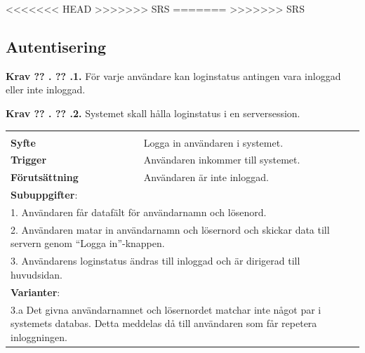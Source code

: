 \documentclass[a4paper]{article}
\newcommand\getcurrentref[1]{%
 \ifnumequal{\value{#1}}{0}
  {??}
  {\the\value{#1}}%
}
\newcommand\requirement[2]{
	\numberedrow{Krav}{#1}{#2}
}
\newcommand\scenario[2] {
	\numberedrow{Scenario}{#1}{#2}
}
\newcommand\numberedrow[3]{
	\noindent
	\textbf{#1 \getcurrentref{section}.\getcurrentref{subsection}.#2.} #3
	
}
\begin{document}
<<<<<<< HEAD
>>>>>>> SRS
=======
>>>>>>> SRS
\subsection{Autentisering}
\label{krav-funk-aut}
\requirement{1}{För varje användare kan loginstatus antingen vara inloggad eller inte inloggad.}
\requirement{2}{Systemet skall hålla loginstatus i en serversession.}


\begin{table}[H]
\begin{tabular}{ | p{2cm} p{11cm} | }
   
        \hline
	\multicolumn{2}{|p{13cm}|}{ \indent\scenario{1}} \\
    \textbf{Syfte} & Logga in användaren i systemet.\\
    \textbf{Trigger} & Användaren inkommer till systemet. \\
    \textbf{Förutsättning} & Användaren är inte inloggad.\\
    \hline

	\multicolumn{2}{|p{13cm}|}{ \textbf{Subuppgifter}:} \\

	\multicolumn{2}{|p{13cm}|}{ 1. Användaren får datafält för användarnamn och lösenord.}\\
	\multicolumn{2}{|p{13cm}|}{ 2. Användaren matar in användarnamn och lösernord och skickar data till servern genom ``Logga in''-knappen.} \\	
	\multicolumn{2}{|p{13cm}|}{ 3. Användarens loginstatus ändras till inloggad och är dirigerad till huvudsidan. }\\ \hline
    \multicolumn{2}{|p{13cm}|}{ \textbf{Varianter}: }\\
	\multicolumn{2}{|p{13cm}|}{ 3.a Det givna användarnamnet och lösernordet matchar inte något par i systemets databas. Detta meddelas då till användaren som får repetera inloggningen.}\\
	    \hline


\end{tabular}
\end{table}
\end{document}
